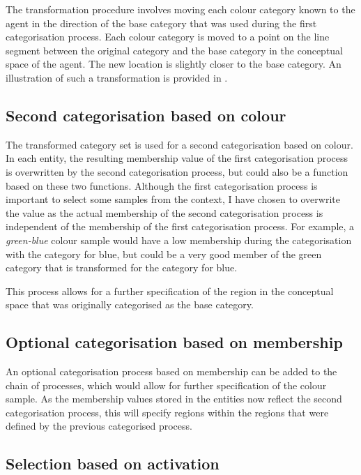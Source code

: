 The transformation procedure involves moving each colour category
known to the agent in the direction of the base category that was used
during the first categorisation process. Each colour category is moved
to a point on the line segment between the original category and the
base category in the conceptual space of the agent. The new location
is slightly closer to the base category. An illustration of such a
transformation is provided in .

\subsection{Second categorisation based on colour}

The transformed category set is used for a second categorisation based
on colour. In each entity, the resulting membership value of the first
categorisation process is overwritten by the second categorisation
process, but could also be a function based on these two
functions. Although the first categorisation process is important to
select some samples from the context, I have chosen to overwrite the
value as the actual membership of the second categorisation process
is independent of the membership of the first categorisation
process. For example, a \textit{green-blue} colour sample would have a low
membership during the categorisation with the category for blue, but
could be a very good member of the green category that is transformed
for the category for blue.

This process allows for a further specification of the region in the
conceptual space that was originally categorised as the base category.

\subsection{Optional categorisation based on membership}

An optional categorisation process based on membership can be added to
the chain of processes, which would allow for further specification of
the colour sample. As the membership values stored in the entities now
reflect the second categorisation process, this will specify regions
within the regions that were defined by the previous categorised
process.

\subsection{Selection based on activation}

